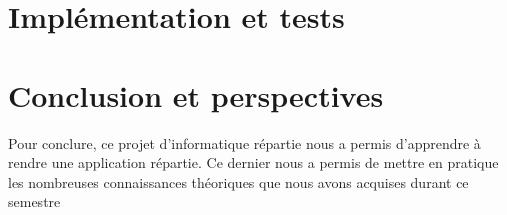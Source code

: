 \documentclass[a4paper,10pt]{report}
\begin{document}
%
%
%
%
%
%

\chapter{Implémentation et tests}
    


\chapter{Conclusion et perspectives}
    
    
    Pour conclure, ce projet d'informatique répartie nous a permis d'apprendre à rendre une application répartie. Ce dernier nous a permis de mettre en pratique les nombreuses connaissances théoriques que nous avons acquises durant ce semestre 
\end{document}
